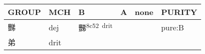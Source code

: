 \documentclass[14pt,a4paper]{scrartcl}
\begin{document}
\begin{longtable}[c]{@{}llllll@{}}
\toprule
\begin{minipage}[b]{0.14\columnwidth}\raggedright\strut
GROUP
\strut\end{minipage} &
\begin{minipage}[b]{0.14\columnwidth}\raggedright\strut
MCH
\strut\end{minipage} &
\begin{minipage}[b]{0.14\columnwidth}\raggedright\strut
B
\strut\end{minipage} &
\begin{minipage}[b]{0.14\columnwidth}\raggedright\strut
A
\strut\end{minipage} &
\begin{minipage}[b]{0.14\columnwidth}\raggedright\strut
none
\strut\end{minipage} &
\begin{minipage}[b]{0.14\columnwidth}\raggedright\strut
PURITY
\strut\end{minipage}\tabularnewline
\midrule
\endhead
\begin{minipage}[t]{0.14\columnwidth}\raggedright\strut
豒
\strut\end{minipage} &
\begin{minipage}[t]{0.14\columnwidth}\raggedright\strut
dej
\strut\end{minipage} &
\begin{minipage}[t]{0.14\columnwidth}\raggedright\strut
豒\textsuperscript{8c52~drit}
\strut\end{minipage} &
\begin{minipage}[t]{0.14\columnwidth}\raggedright\strut
\strut\end{minipage} &
\begin{minipage}[t]{0.14\columnwidth}\raggedright\strut
\strut\end{minipage} &
\begin{minipage}[t]{0.14\columnwidth}\raggedright\strut
pure:B
\strut\end{minipage}\tabularnewline
\begin{minipage}[t]{0.14\columnwidth}\raggedright\strut
弟
\strut\end{minipage} &
\begin{minipage}[t]{0.14\columnwidth}\raggedright\strut
drit
\strut\end{minipage} &
\begin{minipage}[t]{0.14\columnwidth}\raggedright\strut
\strut\end{minipage} &
\begin{minipage}[t]{0.14\columnwidth}\raggedright\strut

\end{minipage}
\end{longtable}
\end{document}
